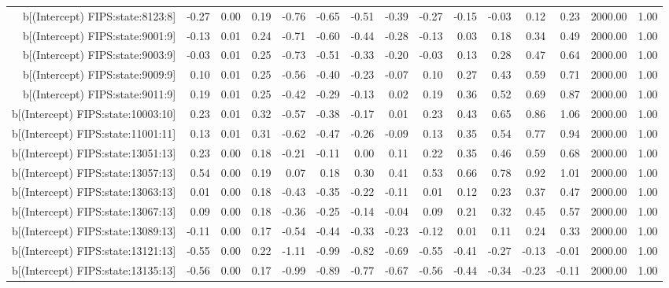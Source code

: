 \begin{table}[ht]
\begin{tabular}{rrrrrrrrrrrrrrr}
  b[(Intercept) FIPS:state:8123:8] & -0.27 & 0.00 & 0.19 & -0.76 & -0.65 & -0.51 & -0.39 & -0.27 & -0.15 & -0.03 & 0.12 & 0.23 & 2000.00 & 1.00 \\ 
  b[(Intercept) FIPS:state:9001:9] & -0.13 & 0.01 & 0.24 & -0.71 & -0.60 & -0.44 & -0.28 & -0.13 & 0.03 & 0.18 & 0.34 & 0.49 & 2000.00 & 1.00 \\ 
  b[(Intercept) FIPS:state:9003:9] & -0.03 & 0.01 & 0.25 & -0.73 & -0.51 & -0.33 & -0.20 & -0.03 & 0.13 & 0.28 & 0.47 & 0.64 & 2000.00 & 1.00 \\ 
  b[(Intercept) FIPS:state:9009:9] & 0.10 & 0.01 & 0.25 & -0.56 & -0.40 & -0.23 & -0.07 & 0.10 & 0.27 & 0.43 & 0.59 & 0.71 & 2000.00 & 1.00 \\ 
  b[(Intercept) FIPS:state:9011:9] & 0.19 & 0.01 & 0.25 & -0.42 & -0.29 & -0.13 & 0.02 & 0.19 & 0.36 & 0.52 & 0.69 & 0.87 & 2000.00 & 1.00 \\ 
  b[(Intercept) FIPS:state:10003:10] & 0.23 & 0.01 & 0.32 & -0.57 & -0.38 & -0.17 & 0.01 & 0.23 & 0.43 & 0.65 & 0.86 & 1.06 & 2000.00 & 1.00 \\ 
  b[(Intercept) FIPS:state:11001:11] & 0.13 & 0.01 & 0.31 & -0.62 & -0.47 & -0.26 & -0.09 & 0.13 & 0.35 & 0.54 & 0.77 & 0.94 & 2000.00 & 1.00 \\ 
  b[(Intercept) FIPS:state:13051:13] & 0.23 & 0.00 & 0.18 & -0.21 & -0.11 & 0.00 & 0.11 & 0.22 & 0.35 & 0.46 & 0.59 & 0.68 & 2000.00 & 1.00 \\ 
  b[(Intercept) FIPS:state:13057:13] & 0.54 & 0.00 & 0.19 & 0.07 & 0.18 & 0.30 & 0.41 & 0.53 & 0.66 & 0.78 & 0.92 & 1.01 & 2000.00 & 1.00 \\ 
  b[(Intercept) FIPS:state:13063:13] & 0.01 & 0.00 & 0.18 & -0.43 & -0.35 & -0.22 & -0.11 & 0.01 & 0.12 & 0.23 & 0.37 & 0.47 & 2000.00 & 1.00 \\ 
  b[(Intercept) FIPS:state:13067:13] & 0.09 & 0.00 & 0.18 & -0.36 & -0.25 & -0.14 & -0.04 & 0.09 & 0.21 & 0.32 & 0.45 & 0.57 & 2000.00 & 1.00 \\ 
  b[(Intercept) FIPS:state:13089:13] & -0.11 & 0.00 & 0.17 & -0.54 & -0.44 & -0.33 & -0.23 & -0.12 & 0.01 & 0.11 & 0.24 & 0.33 & 2000.00 & 1.00 \\ 
  b[(Intercept) FIPS:state:13121:13] & -0.55 & 0.00 & 0.22 & -1.11 & -0.99 & -0.82 & -0.69 & -0.55 & -0.41 & -0.27 & -0.13 & -0.01 & 2000.00 & 1.00 \\ 
  b[(Intercept) FIPS:state:13135:13] & -0.56 & 0.00 & 0.17 & -0.99 & -0.89 & -0.77 & -0.67 & -0.56 & -0.44 & -0.34 & -0.23 & -0.11 & 2000.00 & 1.00 \\ 

\end{tabular}
\end{table}

